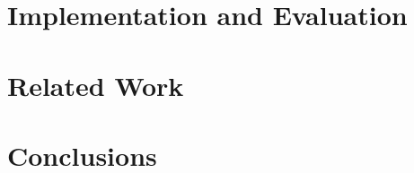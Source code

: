 \documentclass[nocopyrightspace]{sigplanconf}
\begin{document}
\section{\padsd{} Implementation and Evaluation}
\label{sec:implementation}


\section{Related Work}
\label{sec:related}


\section{Conclusions}
\label{sec:conclusions}








%
\end{document}
